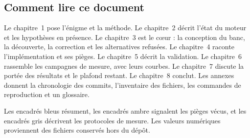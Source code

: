 \subsection*{Comment lire ce document}

Le chapitre~1 pose l'\'enigme et la m\'ethode. Le chapitre~2 d\'ecrit l'\'etat
du moteur et les hypoth\`eses en pr\'esence. Le chapitre~3 est le c\oe{}ur : la
conception du banc, la d\'ecouverte, la correction et les alternatives
refus\'ees. Le chapitre~4 raconte l'impl\'ementation et ses pi\`eges. Le
chapitre~5 d\'ecrit la validation. Le chapitre~6 rassemble les campagnes de
mesure, avec leurs courbes. Le chapitre~7 discute la port\'ee des r\'esultats
et le plafond restant. Le chapitre~8 conclut. Les annexes donnent la
chronologie des commits, l'inventaire des fichiers, les commandes de
reproduction et un glossaire.

Les encadr\'es bleus r\'esument, les encadr\'es ambre signalent les pi\`eges
v\'ecus, et les encadr\'es gris d\'ecrivent les protocoles de mesure. Les
valeurs num\'eriques proviennent des fichiers  conserv\'es
hors du d\'ep\^ot.
